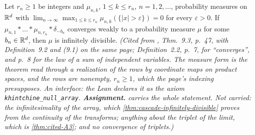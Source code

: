 \begin{theorem}
\label{thm:cited-A6}
\leanok
Let $r_n \ge 1$ be integers and $\mu_{n,k}$, $1 \le k \le r_n$, $n = 1, 2, \dots$, probability
measures on $\mathbb{R}^d$ with $\lim_{n\to\infty}\max_{1\le k\le r_n}\mu_{n,k}(\{|x| > \varepsilon\}) = 0$ for every
$\varepsilon > 0$. If $\mu_{n,1} * \dots * \mu_{n,r_n} * \delta_{-b_n}$ converges weakly to a
probability measure $\mu$ for some $b_n \in \mathbb{R}^d$, then $\mu$ is infinitely divisible.
\statusA\quad{}\quad\emph{(Cited from , Thm.~9.3, p.~47, with
Definition~9.2 and (9.1) on the same page; Definition~2.2, p.~7, for ``converges'', and p.~8 for the
law of a sum of independent variables. The measure form is the theorem read through a realization
of the rows by coordinate maps on product spaces, and the rows are nonempty, $r_n \ge 1$, which the
page's indexing presupposes. An interface: the Lean declares it as the axiom
\texttt{khintchine\_null\_array}. \textbf{Assignment.}  carries the whole statement.
Not carried: the infinitesimality of the array, which \ref{thm:cascade-infinitely-divisible} proves
from the continuity of the transforms; anything about the triplet of the limit, which is
\ref{thm:cited-A3}; and no convergence of triplets.)}
\end{theorem}

